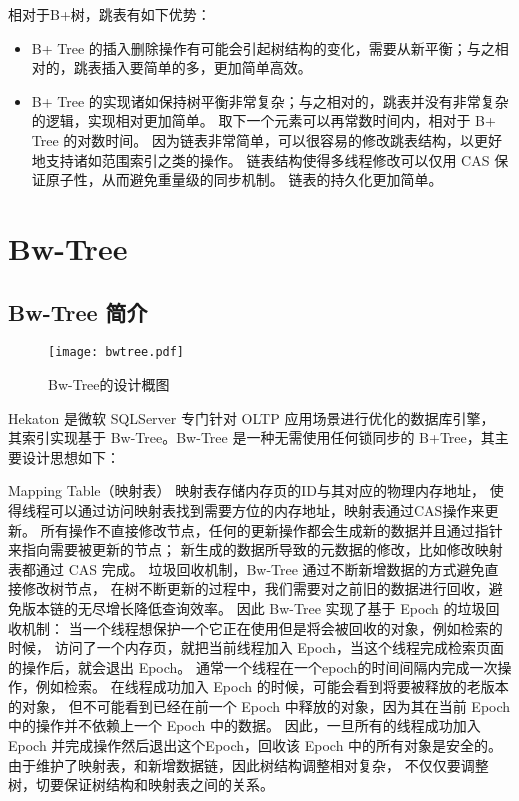 相对于B+树，跳表有如下优势：

\begin{itemize}
\item  B+ Tree 的插入删除操作有可能会引起树结构的变化，需要从新平衡；与之相对的，跳表插入要简单的多，更加简单高效。
\item B+ Tree 的实现诸如保持树平衡非常复杂；与之相对的，跳表并没有非常复杂的逻辑，实现相对更加简单。
取下一个元素可以再常数时间内，相对于 B+ Tree 的对数时间。
因为链表非常简单，可以很容易的修改跳表结构，以更好地支持诸如范围索引之类的操作。
链表结构使得多线程修改可以仅用 CAS 保证原子性，从而避免重量级的同步机制。
链表的持久化更加简单。
\end{itemize}

\section{Bw-Tree}
\subsection{Bw-Tree 简介}

\begin{figure}[h]
  \centering
  \texttt{[image: bwtree.pdf]}
  \caption{Bw-Tree的设计概图}
  \label{fig:bwtree}
\end{figure}

Hekaton\cite{larson2011high} 是微软 SQLServer 专门针对 OLTP 应用场景进行优化的数据库引擎，
其索引实现基于 Bw-Tree。Bw-Tree 是一种无需使用任何锁同步的 B+Tree，其主要设计思想如下：

Mapping Table（映射表） 映射表存储内存页的ID与其对应的物理内存地址，
使得线程可以通过访问映射表找到需要方位的内存地址，映射表通过CAS操作来更新。
所有操作不直接修改节点，任何的更新操作都会生成新的数据并且通过指针来指向需要被更新的节点；
新生成的数据所导致的元数据的修改，比如修改映射表都通过 CAS 完成。
垃圾回收机制，Bw-Tree 通过不断新增数据的方式避免直接修改树节点，
在树不断更新的过程中，我们需要对之前旧的数据进行回收，避免版本链的无尽增长降低查询效率。
因此 Bw-Tree 实现了基于 Epoch 的垃圾回收机制：
当一个线程想保护一个它正在使用但是将会被回收的对象，例如检索的时候，
访问了一个内存页，就把当前线程加入 Epoch，当这个线程完成检索页面的操作后，就会退出 Epoch。
通常一个线程在一个epoch的时间间隔内完成一次操作，例如检索。
在线程成功加入 Epoch 的时候，可能会看到将要被释放的老版本的对象，
但不可能看到已经在前一个 Epoch 中释放的对象，因为其在当前 Epoch 中的操作并不依赖上一个 Epoch 中的数据。
因此，一旦所有的线程成功加入Epoch 并完成操作然后退出这个Epoch，回收该 Epoch 中的所有对象是安全的。
由于维护了映射表，和新增数据链，因此树结构调整相对复杂，
不仅仅要调整树，切要保证树结构和映射表之间的关系。

